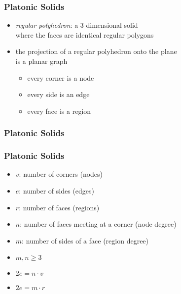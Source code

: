 \documentclass[dvipsnames]{beamer}
\begin{document}
\begin{frame}
  \frametitle{Platonic Solids}

  \begin{itemize}
    \item \emph{regular polyhedron}: a 3-dimensional solid\\
      where the faces are identical regular polygons

    \pause
    \item the projection of a regular polyhedron onto the plane\\
      is a planar graph
    \begin{itemize}
      \item every corner is a node
      \item every side is an edge
      \item every face is a region
    \end{itemize}
  \end{itemize}
\end{frame}

\begin{frame}
  \frametitle{Platonic Solids}

  \begin{example}[cube]
    \begin{center}
    \end{center}
  \end{example}
\end{frame}

\begin{frame}
  \frametitle{Platonic Solids}

  \begin{itemize}
    \item $v$: number of corners (nodes)
    \item $e$: number of sides (edges)
    \item $r$: number of faces (regions)
    \item $n$: number of faces meeting at a corner (node degree)
    \item $m$: number of sides of a face (region degree)
  \end{itemize}

  \pause
  \begin{itemize}
    \item $m,n \geq 3$
    \item $2e = n \cdot v$
    \item $2e = m \cdot r$
  \end{itemize}
\end{frame}
\end{document}
